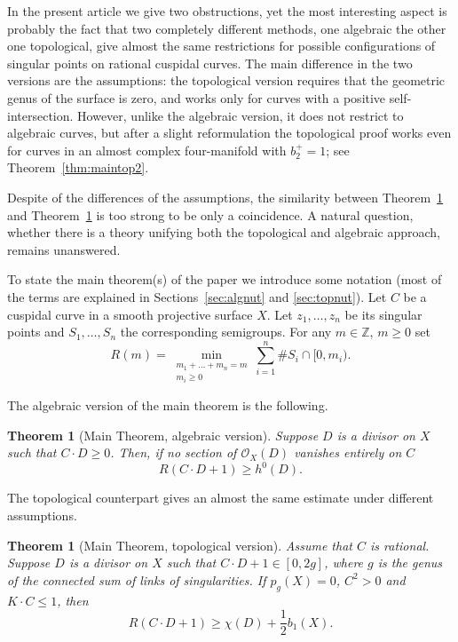 \documentclass[11pt]{amsart}
\numberwithin{equation}{section}
\theoremstyle{plain}
\newtheorem{theorem}[equation]{Theorem}
\theoremstyle{definition}
\begin{document}
In the present article we give two obstructions, yet the most interesting aspect is probably the fact that two completely different methods,
one algebraic the other one topological,
give almost the same restrictions for possible configurations of singular points on rational cuspidal curves.
The main difference in the two versions are
the assumptions: the topological version requires that the geometric genus of the surface is zero, and works only for curves with a positive 
self-intersection.
However, unlike the algebraic version, it does not restrict to algebraic curves, but after a slight reformulation
the topological proof works even for curves in an almost complex four-manifold
with $b_2^+=1$; see Theorem~\ref{thm:maintop2}.

Despite of the differences of the assumptions, the similarity between Theorem~\ref{thm:mainalg} and Theorem~\ref{thm:maintop} is too strong to be
only a coincidence. A natural question, whether there is a theory unifying both the topological and algebraic approach, remains unanswered.

To state the main theorem(s) of the paper we introduce some notation (most of the terms are explained in Sections~\ref{sec:algnut} and \ref{sec:topnut}). 
Let $C$ be a cuspidal curve in a smooth projective surface $X$.
Let $z_1,\ldots,z_n$ be its singular points and $S_1,\ldots,S_n$ the corresponding semigroups. For any $m\in{\mathbb Z}$, $m\ge 0$ set
\begin{equation}\label{eq:defofR}
R(m)=\min_{\substack{m_1+\ldots+m_n=m\\m_i\ge 0}} \sum_{i=1}^n\# S_i\cap[0,m_i).
\end{equation}

The algebraic version of the main theorem is the following.
\begin{theorem}[Main Theorem, algebraic version]\label{thm:mainalg}
Suppose $D$ is a divisor on $X$ such that $C\cdot D\ge 0$. Then, if no section of $\mathcal{O}_X(D)$ vanishes
entirely on $C$
\[R(C\cdot D+1)\ge h^0(D).\]
\end{theorem}

The topological counterpart gives an almost the same estimate under different assumptions.
\begin{theorem}[Main Theorem, topological version]\label{thm:maintop}
Assume that $C$ is rational.
Suppose $D$ is a divisor on $X$ such that $C\cdot D+1\in[0,2g]$, where $g$ is the genus of the connected sum of links of singularities. 
If $p_g(X)=0$, $C^2>0$ and $K\cdot C\le 1$, then
\begin{equation}\label{eq:onRtop}
R(C\cdot D+1)\ge \chi(D)+\frac12 b_1(X).
\end{equation}
\end{theorem}
\end{document}
